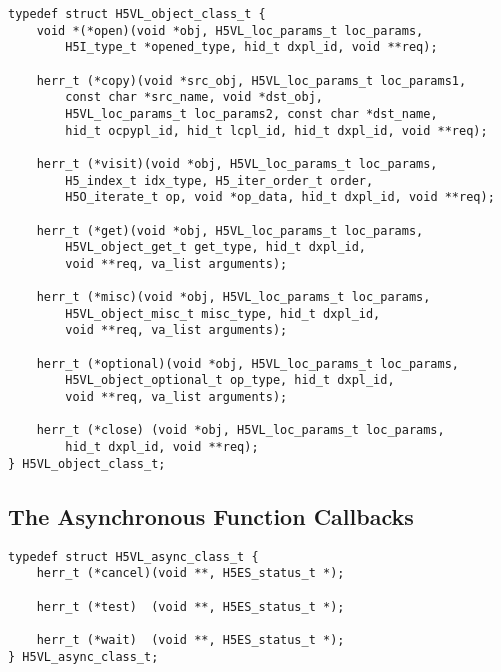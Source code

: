 \begin{lstlisting}
typedef struct H5VL_object_class_t {
    void *(*open)(void *obj, H5VL_loc_params_t loc_params, 
        H5I_type_t *opened_type, hid_t dxpl_id, void **req);

    herr_t (*copy)(void *src_obj, H5VL_loc_params_t loc_params1, 
        const char *src_name, void *dst_obj, 
        H5VL_loc_params_t loc_params2, const char *dst_name,
        hid_t ocpypl_id, hid_t lcpl_id, hid_t dxpl_id, void **req);

    herr_t (*visit)(void *obj, H5VL_loc_params_t loc_params, 
        H5_index_t idx_type, H5_iter_order_t order, 
        H5O_iterate_t op, void *op_data, hid_t dxpl_id, void **req);

    herr_t (*get)(void *obj, H5VL_loc_params_t loc_params, 
        H5VL_object_get_t get_type, hid_t dxpl_id, 
        void **req, va_list arguments);

    herr_t (*misc)(void *obj, H5VL_loc_params_t loc_params, 
        H5VL_object_misc_t misc_type, hid_t dxpl_id, 
        void **req, va_list arguments);

    herr_t (*optional)(void *obj, H5VL_loc_params_t loc_params, 
        H5VL_object_optional_t op_type, hid_t dxpl_id, 
        void **req, va_list arguments);

    herr_t (*close) (void *obj, H5VL_loc_params_t loc_params, 
        hid_t dxpl_id, void **req);
} H5VL_object_class_t;
\end{lstlisting}

\subsection{The Asynchronous Function Callbacks}

\begin{lstlisting}
typedef struct H5VL_async_class_t {
    herr_t (*cancel)(void **, H5ES_status_t *);

    herr_t (*test)  (void **, H5ES_status_t *);

    herr_t (*wait)  (void **, H5ES_status_t *);
} H5VL_async_class_t;
\end{lstlisting}

